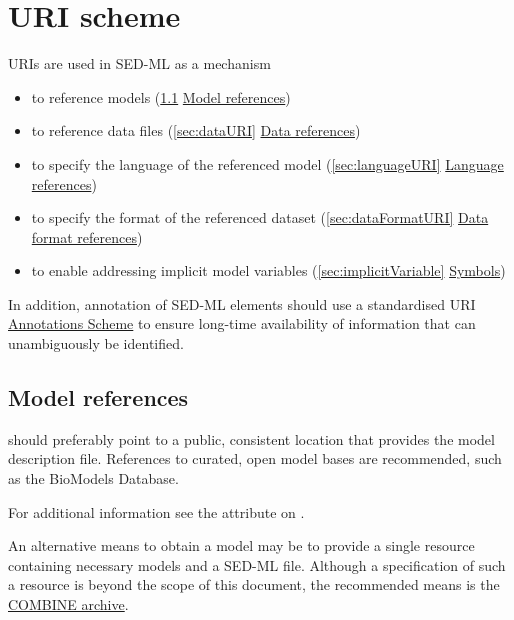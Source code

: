 \section{URI scheme}  
\label{sec:uriScheme}
URIs are used in SED-ML as a mechanism
\begin{itemize}
	\item to reference models (\ref{sec:modelURI} \hyperref[sec:modelURI]{Model references})
	\item to reference data files (\ref{sec:dataURI} \hyperref[sec:dataURI]{Data references})
	\item to specify the language of the referenced model (\ref{sec:languageURI} \hyperref[sec:languageURI]{Language references})
	\item to specify the format of the referenced dataset (\ref{sec:dataFormatURI} \hyperref[sec:dataFormatURI]{Data format references})
	\item to enable addressing implicit model variables (\ref{sec:implicitVariable}  \hyperref[sec:implicitVariable]{Symbols})
\end{itemize}

In addition, annotation of SED-ML elements should use a standardised URI \hyperref[sec:annotations]{Annotations Scheme} to ensure long-time availability of information that can unambiguously be identified.


\subsection{Model references}
\label{sec:modelURI}
 should preferably point to a public, consistent location that provides the model description file. References to curated, open model bases are recommended, such as the BioModels Database. 

For additional information see the \hyperref[sec:model_source]{} attribute on \Model.

An alternative means to obtain a model may be to provide a single resource containing necessary models and a SED-ML file. Although a specification of such a resource is beyond the scope of this document, the recommended means is the \hyperref[sec:archive]{COMBINE archive}.


